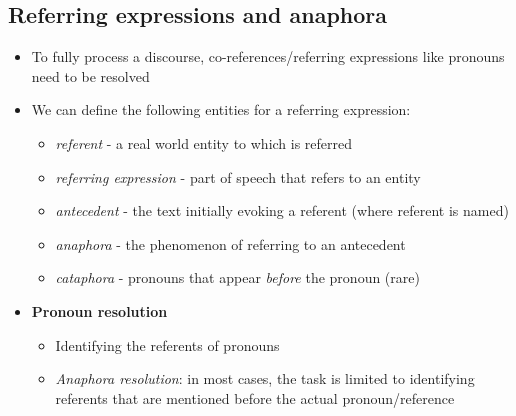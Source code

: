 \subsection{Referring expressions and anaphora}
\begin{itemize}
	\item To fully process a discourse, co-references/referring expressions like pronouns need to be resolved
	\item We can define the following entities for a referring expression:
	\begin{itemize}
		\item \textit{referent} - a real world entity to which is referred
		\item \textit{referring expression} - part of speech that refers to an entity
		\item \textit{antecedent} - the text initially evoking a referent (where referent is named)
		\item \textit{anaphora} - the phenomenon of referring to an antecedent
		\item \textit{cataphora} - pronouns that appear \textit{before} the pronoun (rare)
	\end{itemize}
	\item \textbf{Pronoun resolution}
	\begin{itemize}
		\item Identifying the referents of pronouns
		\item \textit{Anaphora resolution}: in most cases, the task is limited to identifying referents that are mentioned before the actual pronoun/reference
	\end{itemize}
\end{itemize}
